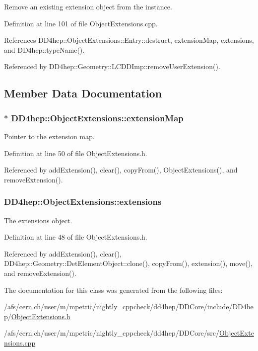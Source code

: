 Remove an existing extension object from the instance. 

Definition at line 101 of file ObjectExtensions.cpp.

References DD4hep::ObjectExtensions::Entry::destruct, extensionMap, extensions, and DD4hep::typeName().

Referenced by DD4hep::Geometry::LCDDImp::removeUserExtension().

\subsection{Member Data Documentation}
\hypertarget{class_d_d4hep_1_1_object_extensions_a6f517da18e14dc6f4de73a48744e8262}{
\subsubsection[{extensionMap}]{$\ast$ {\bf DD4hep::ObjectExtensions::extensionMap}}}
\label{class_d_d4hep_1_1_object_extensions_a6f517da18e14dc6f4de73a48744e8262}


Pointer to the extension map. 

Definition at line 50 of file ObjectExtensions.h.

Referenced by addExtension(), clear(), copyFrom(), ObjectExtensions(), and removeExtension().\hypertarget{class_d_d4hep_1_1_object_extensions_ac96afa01e09dec7a795c88b67c054007}{
\subsubsection[{extensions}]{ {\bf DD4hep::ObjectExtensions::extensions}}}
\label{class_d_d4hep_1_1_object_extensions_ac96afa01e09dec7a795c88b67c054007}


The extensions object. 

Definition at line 48 of file ObjectExtensions.h.

Referenced by addExtension(), clear(), DD4hep::Geometry::DetElementObject::clone(), copyFrom(), extension(), move(), and removeExtension().

The documentation for this class was generated from the following files:\begin{DoxyCompactItemize}
\item 
/afs/cern.ch/user/m/mpetric/nightly\_\-cppcheck/dd4hep/DDCore/include/DD4hep/\hyperlink{_object_extensions_8h}{ObjectExtensions.h}\item 
/afs/cern.ch/user/m/mpetric/nightly\_\-cppcheck/dd4hep/DDCore/src/\hyperlink{_object_extensions_8cpp}{ObjectExtensions.cpp}\end{DoxyCompactItemize}

